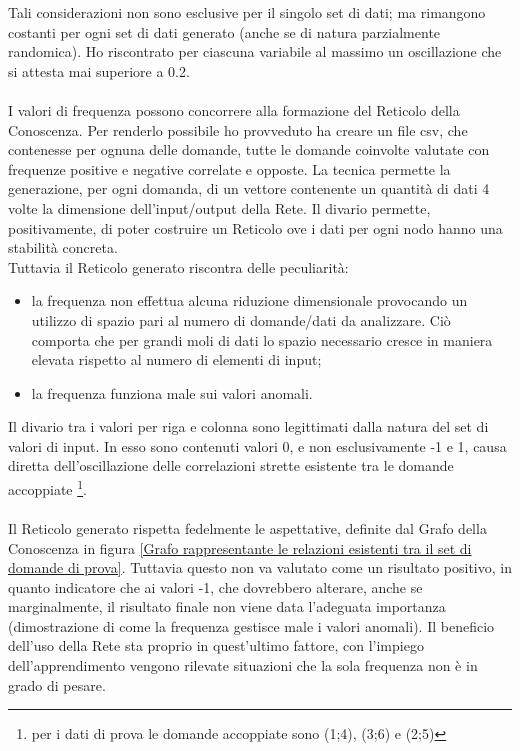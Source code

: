 \noindent
Tali considerazioni non sono esclusive per il singolo set di dati; ma rimangono costanti per ogni set di dati generato (anche se di natura parzialmente randomica). Ho riscontrato per ciascuna variabile al massimo un oscillazione che si attesta mai superiore a 0.2.
\\\\
I valori di frequenza possono concorrere alla formazione del Reticolo della Conoscenza. Per renderlo possibile ho provveduto ha creare un file csv, che contenesse per ognuna delle domande, tutte le domande coinvolte valutate con frequenze positive e negative correlate e opposte. La tecnica permette la generazione, per ogni domanda, di un vettore contenente un quantit\`a di dati 4 volte la dimensione dell'input/output della Rete.
Il divario permette, positivamente, di poter costruire un Reticolo ove i dati per ogni nodo hanno una stabilit\`a concreta.\\
Tuttavia il Reticolo generato riscontra delle peculiarit\`a:
\begin{itemize}
\item la frequenza non effettua alcuna riduzione dimensionale provocando un utilizzo di spazio pari al numero di domande/dati da analizzare. Ci\`o comporta che per grandi moli di dati lo spazio necessario cresce in maniera elevata rispetto al numero di elementi di input;
\item la frequenza funziona male sui valori anomali.
\end{itemize}
\noindent
Il divario tra i valori per riga e colonna sono legittimati dalla natura del set di valori di input. In esso sono contenuti valori 0, e non esclusivamente -1 e 1, causa diretta dell'oscillazione delle correlazioni strette esistente tra le domande accoppiate \footnote{per i dati di prova le domande accoppiate sono (1;4), (3;6) e (2;5)}.\\\\
\noindent
Il Reticolo generato rispetta fedelmente le aspettative, definite dal Grafo della Conoscenza in figura \ref{Grafo rappresentante le relazioni esistenti tra il set di domande di prova}. Tuttavia questo non va valutato come un risultato positivo, in quanto indicatore che ai valori -1, che dovrebbero alterare, anche se marginalmente, il risultato finale non viene data l'adeguata importanza (dimostrazione di come la frequenza gestisce male i valori anomali). Il beneficio dell'uso della Rete sta proprio in quest'ultimo fattore, con l'impiego dell'apprendimento vengono rilevate situazioni che la sola frequenza non \`e in grado di pesare.

